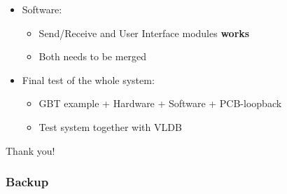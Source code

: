 \documentclass[aspectratio=43]{beamer}
\makeatletter
\newenvironment{backgroundblock}[2]{%
  \global\setbox\@backgroundblock=\vbox\bgroup%
    \unvbox\@backgroundblock%
    \vbox to0pt\bgroup\vskip#2\hbox to0pt\bgroup\hskip#1\relax%
}{\egroup\egroup\egroup}
\makeatother
\begin{document}
{\begin{frame}[t]
\begin{itemize}
\item Software:
	\begin{itemize}
	\item Send/Receive and User Interface modules \textbf{works}
	\item Both needs to be merged
	\end{itemize}
\end{itemize}	


\begin{itemize}
\item Final test of the whole system:
	\begin{itemize}
	\item GBT example + Hardware + Software + PCB-loopback
	\item Test system together with VLDB
	\end{itemize}
\end{itemize}

\end{frame}

\begin{frame}
\Huge{\centerline{Thank you!}}
\end{frame}

\begin{frame}
\frametitle{Backup}
\end{frame}

}
\end{document}
